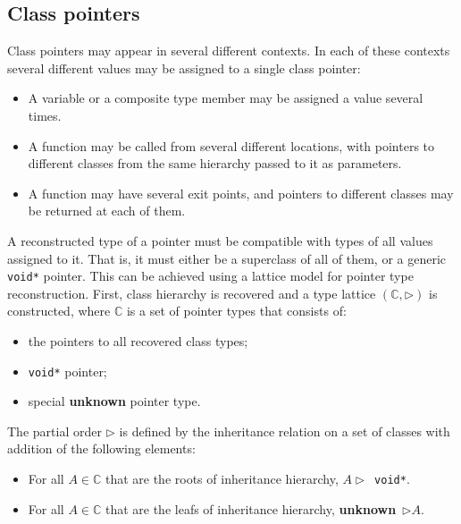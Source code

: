 \documentclass[10pt, conference, compsocconf]{IEEEtran}
\newcommand{\compact}{}
\newcommand{\skipspace}{}
\newcommand{\skipsectionspace}{}
\newcommand{\nC}{\mathbb{C}}
\begin{document}
\subsection{Class pointers}\skipsectionspace
Class pointers may appear in several different contexts.
In each of these contexts several different values may be assigned to a single class pointer:
\skipspace\begin{itemize}\compact
\item A variable or a composite type member may be assigned a value several times.
\item A function may be called from several different locations, 
  with pointers to different classes from the same hierarchy passed to it as parameters.
\item A function may have several exit points, and pointers to different
  classes may be returned at each of them.
\end{itemize}

A reconstructed type of a pointer must be compatible with types 
of all values assigned to it.
That is, it must either be a superclass of all of them, or a generic 
\lstinline{void*} pointer.
This can be achieved using a lattice model for pointer type 
reconstruction.
First, class hierarchy is recovered and a type lattice $(\nC, \rhd)$ is 
constructed, where $\nC$ is a set of pointer types that consists of:
\skipspace\begin{itemize}\compact
\item the pointers to all recovered class types;
\item \lstinline{void*} pointer;
\item special \textbf{unknown} pointer type.
\end{itemize}

The partial order $\rhd$ is defined by the inheritance relation on a set of
classes with addition of the following elements:
\skipspace\begin{itemize}\compact
\item For all $A \in \nC$ that are the roots of inheritance hierarchy, $A \rhd$~\lstinline{void*}.
\item For all $A \in \nC$ that are the leafs of inheritance hierarchy, \textbf{unknown}~$\rhd A$.
\end{itemize}

\end{document}
